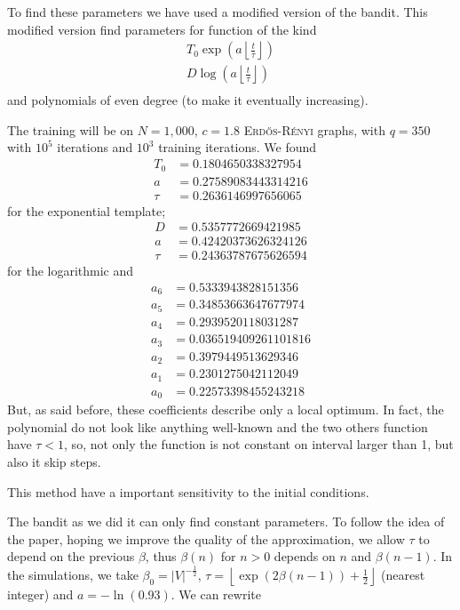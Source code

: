 \documentclass[a4paper, 11pt]{article}
\newcommand{\floor}[1]{{\left\lfloor #1 \right\rfloor}}
\begin{document}
\bigskip

To find these parameters we have used a modified version of the bandit. This modified version find parameters for function of the kind
\[
    \begin{aligned}
        T_0\exp\left(a\floor{\frac{t}{\tau}}\right)\\
        D \log \left(a\floor{\frac{t}{\tau}}\right)\\
    \end{aligned}
\]
and polynomials of even degree (to make it eventually increasing).

The training will be on $N=1,000$, $c=1.8$ \textsc{Erd\H{o}s-Rényi} graphs, with $q=350$ with $10^5$ iterations and $10^3$ training iterations. We found 
\[
    \begin{aligned}
        T_0 &= 0.1804650338327954\\
        a &= 0.27589083443314216\\
        \tau &= 0.2636146997656065
    \end{aligned}
\]
for the exponential template;
\[
    \begin{aligned}
        D &= 0.5357772669421985\\
        a &= 0.42420373626324126\\
        \tau &= 0.24363787675626594
    \end{aligned}
\]
for the logarithmic and 
\[
    \begin{aligned}
        a_6 &= 0.5333943828151356\\
        a_5 &= 0.34853663647677974\\
        a_4 &= 0.2939520118031287\\
        a_3 &= 0.036519409261101816\\
        a_2 &= 0.3979449513629346\\
        a_1 &= 0.2301275042112049\\
        a_0 &= 0.22573398455243218
    \end{aligned}
\]
But, as said before, these coefficients describe only a local optimum. In fact, the polynomial do not look like anything well-known and the two others function have $\tau < 1$, so, not only the function is not constant on interval larger than 1, but also it skip steps.

This method have a important sensitivity to the initial conditions.

\bigskip

The bandit as we did it can only find constant parameters. To follow the idea of the paper, hoping we improve the quality of the approximation, we allow $\tau$ to depend on the previous $\beta$, thus $\beta(n)$ for $n>0$ depends on $n$ and $\beta(n-1)$. In the simulations, we take $\beta_0 = {\lvert V\rvert}^{-\frac{1}{2}}$, $\tau = \floor{\exp(2\beta(n-1))+\frac{1}{2}}$ (nearest integer) and $a = -\ln(0.93)$. We can rewrite
\end{document}
